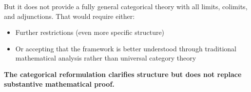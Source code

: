\documentclass[11pt,a4paper]{article}
\theoremstyle{definition}
\theoremstyle{remark}
\begin{document}
But it does not provide a fully general categorical theory with all limits, colimits, and adjunctions. That would require either:
\begin{itemize}
\item Further restrictions (even more specific structure)
\item Or accepting that the framework is better understood through traditional mathematical analysis rather than universal category theory
\end{itemize}

\textbf{The categorical reformulation clarifies structure but does not replace substantive mathematical proof.}
\end{document}
